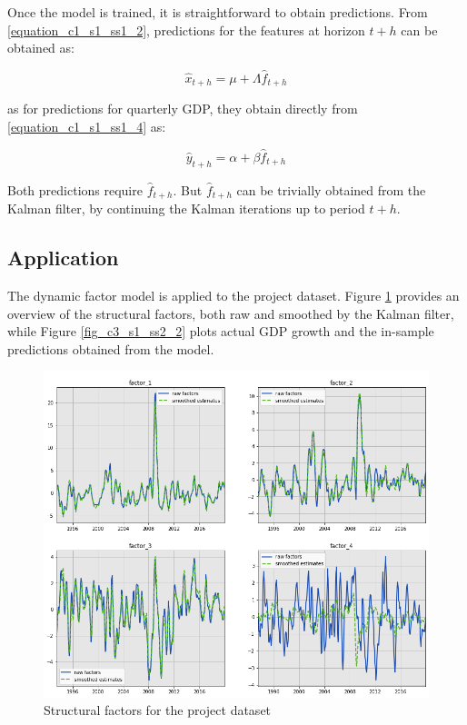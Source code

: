 Once the model is trained, it is straightforward to obtain predictions. From \ref{equation_c1_s1_ss1_2}, predictions for the features at horizon $t+h$ can be obtained as:

\begin{equation}
\hat{x}_{t+h} = \mu + \Lambda \hat{f}_{t+h}
\label{equation_c1_s1_ss3_1}
\end{equation}

as for predictions for quarterly GDP, they obtain directly from \ref{equation_c1_s1_ss1_4} as:

\begin{equation}
\hat{y}_{t+h} = \alpha + \beta \hat{f}_{t+h}
\label{equation_c1_s1_ss3_2}
\end{equation}

Both predictions require $\hat{f}_{t+h}$. But $\hat{f}_{t+h}$ can be trivially obtained from the Kalman filter, by continuing the Kalman iterations up to period $t+h$.


\subsection{Application}
\label{chapter3_section1_subsection4}


The dynamic factor model is applied to the project dataset. Figure \ref{fig_c3_s1_ss2_1} provides an overview of the structural factors, both raw and smoothed by the Kalman filter, while Figure \ref{fig_c3_s1_ss2_2} plots actual GDP growth and the in-sample predictions obtained from the model.

\begin{figure}[H]
\centering
\includegraphics[scale=0.5]{images/structural_factors.png}
\caption{Structural factors for the project dataset}
\label{fig_c3_s1_ss2_1}
\end{figure}


